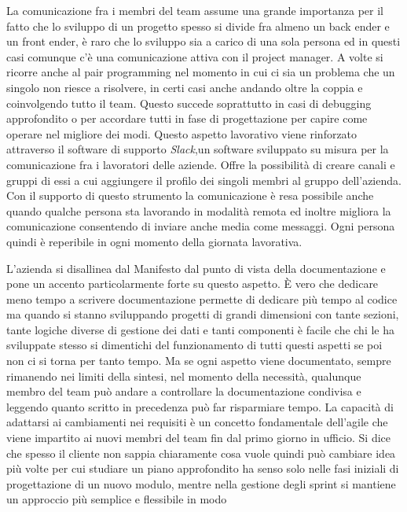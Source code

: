 \documentclass[target=bach,aauheader=,style=]{thud}
\begin{document}
\par La comunicazione fra i membri del team assume una grande importanza per il fatto che lo sviluppo di un progetto spesso si divide fra almeno un back ender e un
front ender, è raro che lo sviluppo sia a carico di una sola persona ed in questi casi comunque c'è una comunicazione attiva con il project manager.
A volte si ricorre anche al pair programming nel momento in cui ci sia un problema che un singolo non riesce a risolvere, in certi casi anche andando oltre la
coppia e coinvolgendo tutto il team. Questo succede soprattutto in casi di debugging approfondito o per accordare tutti in fase di progettazione per capire
come operare nel migliore dei modi.
Questo aspetto lavorativo viene rinforzato attraverso il software di supporto \textit{Slack}\cite{slack},un software sviluppato su misura per la comunicazione fra
i lavoratori delle aziende. Offre la possibilità di creare canali e gruppi di essi a cui aggiungere il profilo dei singoli membri al gruppo dell'azienda.
Con il supporto di questo strumento la comunicazione è resa possibile anche quando qualche persona sta lavorando in modalità remota ed inoltre migliora la
comunicazione consentendo di inviare anche media come messaggi. Ogni persona quindi è reperibile in ogni momento della giornata lavorativa.
\par L'azienda si disallinea dal Manifesto dal punto di vista della documentazione e pone un accento particolarmente forte su questo aspetto.
È vero che dedicare meno tempo a scrivere documentazione permette di dedicare più tempo al codice ma quando si stanno sviluppando progetti di grandi dimensioni
con tante sezioni, tante logiche diverse di gestione dei dati e tanti componenti è facile che chi le ha sviluppate stesso si dimentichi del funzionamento di
tutti questi aspetti se poi non ci si torna per tanto tempo. Ma se ogni aspetto viene documentato, sempre rimanendo nei limiti della sintesi, nel momento della
necessità, qualunque membro del team può andare a controllare la documentazione condivisa e leggendo quanto scritto in precedenza può far risparmiare tempo.
La capacità di adattarsi ai cambiamenti nei requisiti è un concetto fondamentale dell'agile che viene impartito ai nuovi membri del team fin dal primo giorno
in ufficio. Si dice che spesso il cliente non sappia chiaramente cosa vuole quindi può cambiare idea più volte per cui studiare un piano approfondito ha
senso solo nelle fasi iniziali di progettazione di un nuovo modulo, mentre nella gestione degli sprint si mantiene un approccio più semplice e flessibile in modo
\end{document}
